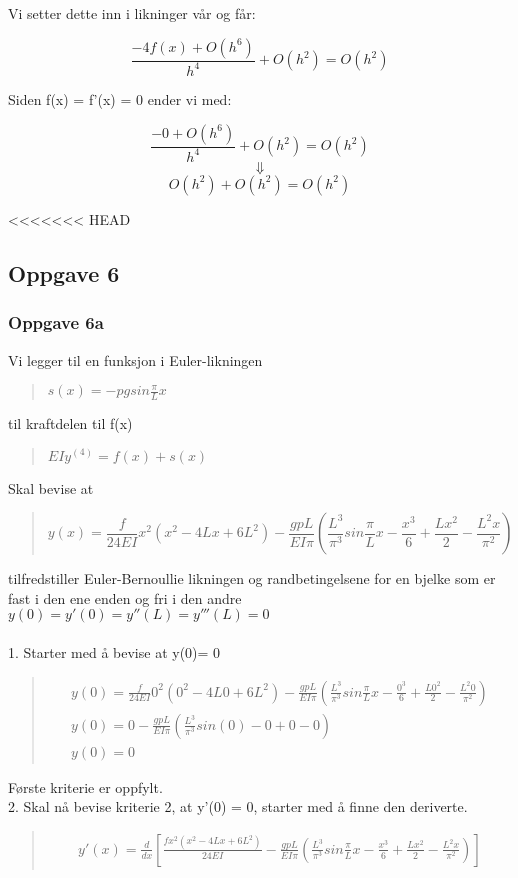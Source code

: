 Vi setter dette inn i likninger vår og får:

\begin{equation*}
\frac{-4f(x) + O(h^6)}{h^4} + O(h^2) = O(h^2)
\end{equation*}

Siden f(x) = f'(x) = 0 ender vi med:


\begin{equation*}
\frac{-0+ O(h^6)}{h^4} + O(h^2) = O(h^2)
\end{equation*}
\begin{equation*}
\Downarrow
\end{equation*}
\begin{equation*}
O(h^2) + O(h^2) = O(h^2)
\end{equation*}

<<<<<<< HEAD
\subsection{Oppgave 6}
\subsubsection{Oppgave 6a}
Vi legger til en funksjon i Euler-likningen
\begin{quote}
$s(x) = -pgsin\frac{\pi}{L} x $
\end{quote} 
til kraftdelen til f(x)
\begin{quote}
$EIy^{(4)} = f(x) + s(x)$
\end{quote}
Skal bevise at
\begin{quote}
\begin{equation}
y(x) = \frac{f}{24EI} x^2 (x^2 - 4Lx + 6L^2) - \frac{gpL}{EI\pi} (\frac{L^3}{\pi^3} sin\frac{\pi}{L}x - \frac{x^3}{6} + \frac{Lx^2}{2} - \frac{L^2 x}{\pi^2})
\end{equation}
\end{quote}
tilfredstiller Euler-Bernoullie likningen og randbetingelsene for en bjelke som er fast i den ene enden og fri i den andre\\
$y(0) = y'(0) = y''(L) = y'''(L) = 0$ \\
\\
1. Starter med å bevise at y(0)= 0
\begin{quote}
\begin{multline*}
y(0) = \frac{f}{24EI} 0^2 (0^2 - 4L0 + 6L^2) - \frac{gpL}{EI\pi} (\frac{L^3}{\pi^3} sin\frac{\pi}{L}x - \frac{0^3}{6} + \frac{L0^2}{2} - \frac{L^2 0}{\pi^2}) \\
y(0) = 0 - \frac{gpL}{EI\pi} (\frac{L^3}{\pi^3} sin (0) - 0 + 0 - 0 ) \\
y(0) = 0
\end{multline*}
\end{quote}
Første kriterie er oppfylt.
\\
2. Skal nå bevise kriterie 2, at y'(0) = 0, starter med å finne den deriverte.
\begin{quote}
\begin{multline}
y'(x) = \frac{d}{dx} [\frac{fx^2(x^2-4Lx+6L^2)}{24EI} - \frac{gpL}{EI\pi} (\frac{L^3}{\pi^3} sin \frac{\pi}{L}x - \frac{x^3}{6} + \frac{Lx^2}{2} - \frac{L^2x}{\pi^2})]
\end{multline}
\end{quote}

